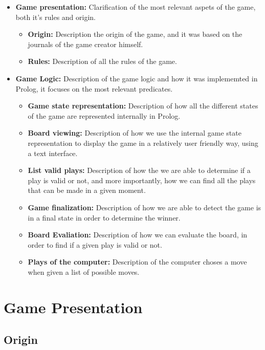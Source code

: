\documentclass[a4paper]{article}
\begin{document}
\begin{itemize}
    \item \textbf{Game presentation:} Clarification of the most relevant aspets of the game, both it's rules and origin.
    \begin{itemize}
        \item \textbf{Origin:} Description the origin of the game, and it was based on the journals of the game
        creator himself.
        \item \textbf{Rules:} Description of all the rules of the game. 
    \end{itemize}
    
    \item \textbf{Game Logic:} Description of the game logic and how it was implememted in Prolog, it focuses
    on the most relevant predicates.
    \begin{itemize}
        \item \textbf{Game state representation:} Description of how all the different states of the game are represented internally in Prolog. 
        \item \textbf{Board viewing:} Description of how we use the internal game state representation to display the game in a relatively user friendly way, using a text interface.
        \item \textbf{List valid plays:} Description of how the we are able to determine if a play is valid or not, and more importantly, how we can find all the plays that can be made in a given moment.
        \item \textbf{Game finalization:} Description of how we are able to detect the game is in a final state in order to determine the winner.
        \item \textbf{Board Evaliation:} Description of how we can evaluate the board, in order to find if a given play is valid or not.
        \item \textbf{Plays of the computer:} Description of the computer choses a move when given a list of possible moves.
    \end{itemize}
\end{itemize}


\pagebreak
\section{Game Presentation}

\subsection{Origin}
\end{document}
